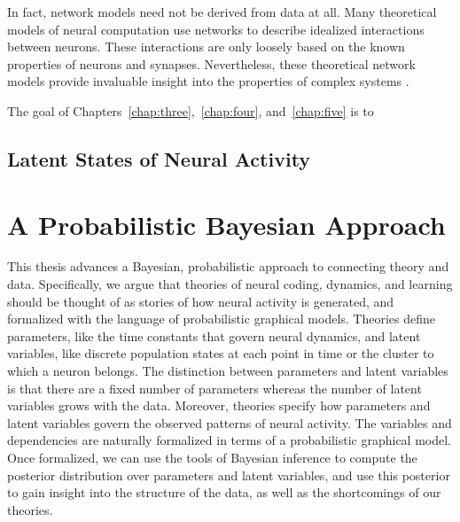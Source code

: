 In fact, network models need not be derived from data at all.  Many
theoretical models of neural computation use networks to describe
idealized interactions between neurons. These interactions are only
loosely based on the known properties of neurons and
synapses. Nevertheless, these theoretical network models provide
invaluable insight into the properties of complex systems
\cite{hopfield1982neural, amit1992modeling, van1996chaos, DayanAbbott,
  sussillo2009generating}.



The goal of Chapters~\ref{chap:three},~\ref{chap:four},
and~\ref{chap:five} is to 


\subsection{Latent States of Neural Activity}



\section{A Probabilistic Bayesian Approach} 
This thesis advances a Bayesian, probabilistic approach to connecting
theory and data. Specifically, we argue that theories of neural
coding, dynamics, and learning should be thought of as stories of how
neural activity is generated, and formalized with the language of
probabilistic graphical models.  Theories define parameters, like the
time constants that govern neural dynamics, and latent variables, like
discrete population states at each point in time or the cluster to
which a neuron belongs. The distinction between parameters and latent
variables is that there are a fixed number of parameters whereas the
number of latent variables grows with the data.  Moreover, theories
specify how parameters and latent variables govern the
observed patterns of neural activity.  The variables and dependencies
are naturally formalized in terms of a probabilistic graphical model.
Once formalized, we can use the tools of Bayesian inference to compute
the posterior distribution over parameters and latent variables, and
use this posterior to gain insight into the structure of the data, as
well as the shortcomings of our theories.

